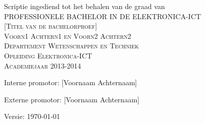 
\AddToShipoutPicture*{\BackgroundPic}
\AddToShipoutPicture*{\BackgroundPicAP}

\newpage

\begin{titlepage}
 \begin{center}
\large Scriptie ingediend tot het behalen van de graad van \\[0.3cm]
\textsc{PROFESSIONELE BACHELOR IN DE ELEKTRONICA-ICT}\\[3.3cm]
\textsc{\LARGE [Titel van de bachelorproef]}\\[0.3cm]
\textsc{\large Voorn1 Achtern1 en Voorn2 Achtern2}\\[0.3cm]
\textsc{\large Departement Wetenschappen en Techniek}\\[0.3cm]
\textsc{\large Opleiding Elektronica-ICT}\\[0.3cm]
\textsc{\large Academiejaar 2013-2014}\\[6.5cm]
 

\begin{minipage}{0.6\textwidth}
\begin{center} \large
Interne promotor: [Voornaam Achternaam]

Externe promotor: [Voornaam Achternaam]
\end{center}
\end{minipage}

 
\vfill
 
{\large Versie: \today}
 
\end{center}
 
\end{titlepage}
